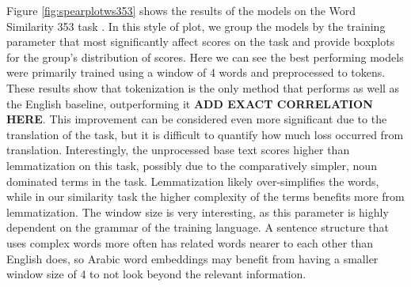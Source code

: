 Figure \ref{fig:spearplotws353} shows the results of the models on the Word Similarity 353 task \cite{finkelstein:2001,hassan:2009}. In this style of plot, we group the models by the training parameter that most significantly affect scores on the task and provide boxplots for the group's distribution of scores. Here we can see the best performing models were primarily trained using a window of 4 words and preprocessed to tokens. These results show that tokenization is the only method that performs as well as the English baseline, outperforming it \textbf{ADD EXACT CORRELATION HERE}. This improvement can be considered even more significant due to the translation of the task, but it is difficult to quantify how much loss occurred from translation. Interestingly, the unprocessed base text scores higher than lemmatization on this task, possibly due to the comparatively simpler, noun dominated terms in the task. Lemmatization likely over-simplifies the words, while in our similarity task the higher complexity of the terms benefits more from lemmatization. The window size is very interesting, as this parameter is highly dependent on the grammar of the training language. A sentence structure that uses complex words more often has related words nearer to each other than English does, so Arabic word embeddings may benefit from having a smaller window size of 4 to not look beyond the relevant information.



